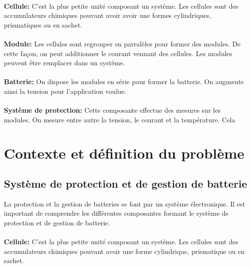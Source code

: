 		\paragraph{}
		\textbf{Cellule:} C'est la plus petite unité composant un système. Les cellules sont des accumulateurs chimiques pouvant avoir avoir une formes cylindriques, prismatiques ou en sachet.  
		
		\paragraph{}
		\textbf{Module:} Les cellules sont regrouper en parralèles pour former des modules. De cette façon, on peut additionner le courant vennant des cellules. Les modules peuvent être remplacer dans un système.
		
		\paragraph{}
		\textbf{Batterie:} On dispose les modules en série pour former la batterie. On augmente ainsi la tension pour l'application voulue.
		
		\paragraph{}
		\textbf{Système de protection:} Cette composante effectue des mesures sur les modules. On mesure entre autre la tension, le courant et la température. Cela \section{Contexte et définition du problème}
		
	\subsection{Système de protection et de gestion de batterie}
		La protection et la gestion de batteries se font par un système électronique. Il est important de comprendre les différentes composantes formant le système de protection et de gestion de batterie.
	
		\paragraph{}
		\textbf{Cellule:} C'est la plus petite unité composant un système. Les cellules sont des accumulateurs chimiques pouvant avoir une forme cylindrique, prismatique ou en sachet.  
		
